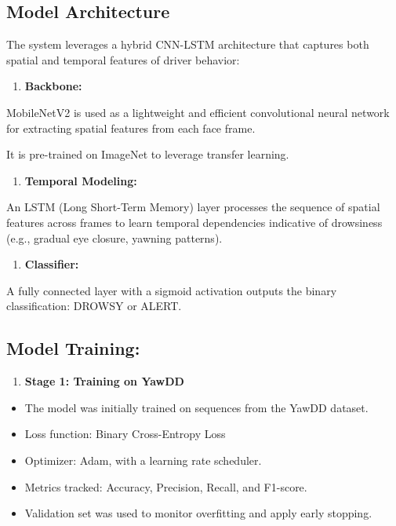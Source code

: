 \documentclass[
  letterpaper,
  DIV=11,
  numbers=noendperiod]{scrreport}
\providecommand{\tightlist}{%
  \setlength{\itemsep}{0pt}\setlength{\parskip}{0pt}}
\begin{document}
\subsection{Model Architecture}\label{model-architecture}

The system leverages a hybrid CNN-LSTM architecture that captures both
spatial and temporal features of driver behavior:

\begin{enumerate}
\def\labelenumi{\arabic{enumi}.}
\tightlist
\item
  \textbf{Backbone:}
\end{enumerate}

MobileNetV2 is used as a lightweight and efficient convolutional neural
network for extracting spatial features from each face frame.

It is pre-trained on ImageNet to leverage transfer learning.

\begin{enumerate}
\def\labelenumi{\arabic{enumi}.}
\setcounter{enumi}{1}
\tightlist
\item
  \textbf{Temporal Modeling:}
\end{enumerate}

An LSTM (Long Short-Term Memory) layer processes the sequence of spatial
features across frames to learn temporal dependencies indicative of
drowsiness (e.g., gradual eye closure, yawning patterns).

\begin{enumerate}
\def\labelenumi{\arabic{enumi}.}
\setcounter{enumi}{2}
\tightlist
\item
  \textbf{Classifier:}
\end{enumerate}

A fully connected layer with a sigmoid activation outputs the binary
classification: DROWSY or ALERT.

\subsection{Model Training:}\label{model-training}

\begin{enumerate}
\def\labelenumi{\arabic{enumi}.}
\tightlist
\item
  \textbf{Stage 1: Training on YawDD}
\end{enumerate}

\begin{itemize}
\item
  The model was initially trained on sequences from the YawDD dataset.
\item
  Loss function: Binary Cross-Entropy Loss
\item
  Optimizer: Adam, with a learning rate scheduler.
\item
  Metrics tracked: Accuracy, Precision, Recall, and F1-score.
\item
  Validation set was used to monitor overfitting and apply early
  stopping.
\end{itemize}
\end{document}
